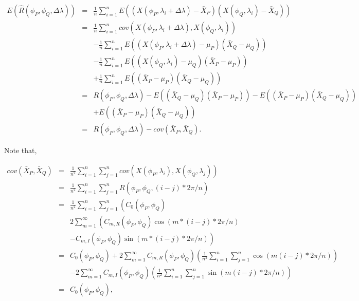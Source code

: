 			\begin{eqnarray*}
				E(\hat{R}(\phi_P, \phi_Q, \Delta \lambda)) &=& \frac{1}{n}\sum_{i = 1}^n E((X(\phi_P, \lambda_i + \Delta \lambda) - \bar{X}_P)(X(\phi_Q, \lambda_i) - \bar{X}_Q)) \\
				&=& \frac{1}{n}\sum_{i=1}^n cov(X(\phi_P, \lambda_i+\Delta \lambda), X(\phi_Q, \lambda_i)) \\
				& & - \frac{1}{n}\sum_{i = 1}^n E((X(\phi_P, \lambda_i + \Delta \lambda) - \mu_P)(\bar{X}_Q - \mu_Q)) \\
				& & -\frac{1}{n}\sum_{i = 1}^n E((X(\phi_Q, \lambda_i) - \mu_Q)(\bar{X}_P - \mu_P)) \\
				& & + \frac{1}{n}\sum_{i = 1}^n E((\bar{X}_P - \mu_P)(\bar{X}_Q - \mu_Q)) \\
				&=& R(\phi_P, \phi_Q, \Delta \lambda) -E((\bar{X}_Q - \mu_Q)(\bar{X}_P - \mu_P)) - E((\bar{X}_P - \mu_P)(\bar{X}_Q - \mu_Q)) \\
				& &  + E((\bar{X}_P - \mu_P)(\bar{X}_Q - \mu_Q)) \\
				&=& R(\phi_P, \phi_Q, \Delta \lambda) - cov(\bar{X}_P, \bar{X}_Q).
			\end{eqnarray*}
				
			Note that, 
				
			\begin{eqnarray*}
				cov(\bar{X}_P, \bar{X}_Q) &=&  \frac{1}{n^2}\sum_{i = 1}^n \sum_{j=1}^n cov(X(\phi_P, \lambda_i), X(\phi_Q, \lambda_j)) \\
				&=& \frac{1}{n^2}\sum_{i = 1}^n \sum_{j=1}^n R(\phi_P, \phi_Q, (i-j)*2\pi/n) \\
				&=& \frac{1}{n^2}\sum_{i = 1}^n \sum_{j=1}^n \left( C_0(\phi_P, \phi_Q) \right.\\
				& &  2\sum_{m=1}^\infty \left( C_{m, R}(\phi_P, \phi_Q) \cos(m*(i-j)*2\pi/n) \right. \\
				& & \left.- C_{m, I}(\phi_P, \phi_Q) \sin(m*(i-j)*2\pi/n) \right) \\
				&=& C_0(\phi_P, \phi_Q) + 2\sum_{m=1}^\infty C_{m, R}(\phi_P, \phi_Q) \left(\frac{1}{n^2}\sum_{i = 1}^n \sum_{j=1}^n \cos(m(i-j)*2\pi/n)\right) \\
				& & - 2\sum_{m=1}^\infty C_{m, I}(\phi_P, \phi_Q) \left(\frac{1}{n^2}\sum_{i = 1}^n \sum_{j=1}^n \sin(m(i-j)*2\pi/n)\right) \\
				&=& C_0(\phi_P, \phi_Q),
			\end{eqnarray*}
				
